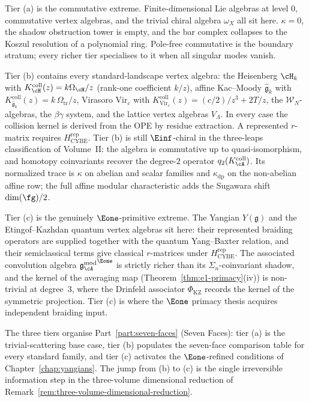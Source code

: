 \begin{remark}
\label{rem:three-tier-examples}
%
Tier (a) is the commutative extreme. Finite-dimensional Lie algebras
at level $0$, commutative vertex algebras, and the trivial chiral
algebra $\omega_X$ all sit here. $\kappa = 0$, the shadow
obstruction tower is empty, and the bar complex collapses to the
Koszul resolution of a polynomial ring. Pole-free commutative is the
boundary stratum; every richer tier specialises to it when all
singular modes vanish.

Tier (b) contains every standard-landscape vertex algebra:
the Heisenberg $\cH_k$ with
$K_{\cH}^{\mathrm{coll}}(z)=k\Omega_{\cH}/z$
\textup{(}rank-one coefficient $k/z$\textup{)}, affine Kac--Moody
$\widehat{\mathfrak g}_k$ with
$K_{\widehat{\mathfrak g}_k}^{\mathrm{coll}}(z)
=k\,\Omega_{\mathrm{tr}}/z$, Virasoro $\mathrm{Vir}_c$ with
$K_{\mathrm{Vir}_c}^{\mathrm{coll}}(z)=(c/2)/z^3+2T/z$,
the $\mathcal{W}_N$-algebras, the $\beta\gamma$ system, and the
lattice vertex algebras $V_\Lambda$. In every case the collision
kernel is derived from the OPE by residue extraction.  A represented
$r$-matrix requires $H_{\mathrm{CYBE}}^{\mathrm{rep}}$.
Tier (b) is still $\Einf$-chiral in the three-leaps classification of
Volume~II: the algebra is commutative up to quasi-isomorphism, and
homotopy coinvariants recover the degree-$2$ operator
$q_2(K_\cA^{\mathrm{coll}})$.  Its normalized trace is $\kappa$ on
abelian and scalar families and $\kappa_{\mathrm{dp}}$ on the
non-abelian affine row; the full affine
modular characteristic adds the Sugawara shift $\dim(\fg)/2$.

Tier (c) is the genuinely $\Eone$-primitive extreme. The Yangian
$Y(\mathfrak g)$ and the Etingof--Kazhdan quantum vertex algebras
sit here: their represented braiding operators are supplied together
with the quantum Yang--Baxter relation, and their semiclassical terms
give classical $r$-matrices under
$H_{\mathrm{CYBE}}^{\mathrm{rep}}$. The associated convolution algebra
${\gAmod}^{\Eone}$ is strictly richer than its
$\Sigma_n$-coinvariant shadow, and the kernel of the averaging map
(Theorem~\ref{thm:e1-primacy}(iv)) is non-trivial at degree~$3$,
where the Drinfeld associator $\Phi_{\mathrm{KZ}}$ records the kernel
of the symmetric projection. Tier (c) is where the $\Eone$
primacy thesis acquires independent braiding input.

The three tiers organise Part~\ref{part:seven-faces} (Seven Faces): tier (a) is the
trivial-scattering base case, tier (b) populates the seven-face
comparison table for every standard family, and tier (c)
activates the $\Eone$-refined conditions of
Chapter~\ref{chap:yangians}. The jump from (b) to (c) is the
single irreversible information step in the three-volume
dimensional reduction of
Remark~\ref{rem:three-volume-dimensional-reduction}.
\end{remark}

